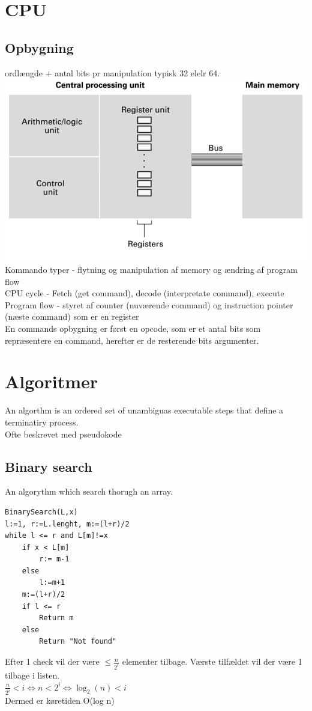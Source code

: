 \documentclass[12pt, a4paper]{article}
\begin{document}
		\section{CPU}
			\subsection{Opbygning}
				ordlængde + antal bits pr manipulation typisk 32 elelr 64.\\
				\includegraphics[width=\linewidth]{assets/cpu.png}\\
				Kommando typer - flytning og manipulation af memory og ændring af program flow\\ 
				CPU cycle - Fetch (get command), decode (interpretate command), execute\\
				Program flow - styret af counter (nuværende command) og instruction pointer (næste command) som er en register\\
				En commands opbygning er først en opcode, som er et antal bits som repræsentere en command, herefter er de resterende bits argumenter.
		\section{Algoritmer}
				An algorthm is an ordered set of unambiguas executable steps that define a terminatiry process.\\
				Ofte beskrevet med pseudokode\\
				\subsection{Binary search}
					An algorythm which search thorugh an array.\\
					\begin{lstlisting}
BinarySearch(L,x)
l:=1, r:=L.lenght, m:=(l+r)/2
while l <= r and L[m]!=x
	if x < L[m]
		r:= m-1
	else
		l:=m+1
	m:=(l+r)/2
	if l <= r
		Return m
	else
		Return "Not found"
					\end{lstlisting}
					Efter 1 check vil der være $\leq \frac{n}{2^i}$ elementer tilbage. Værste tilfældet vil der være 1 tilbage i listen.\\
					$\frac{n}{2^i}<i\iff n<2^i\iff \log_2(n)<i$\\
					Dermed er køretiden O(log n)
\end{document}
